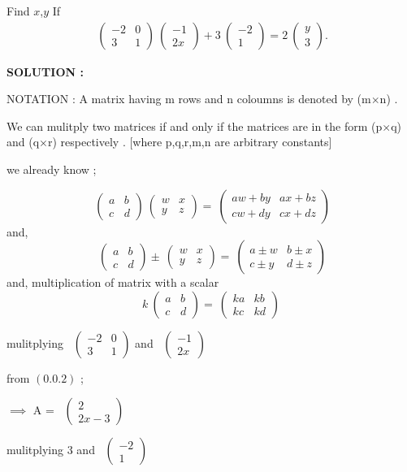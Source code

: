 \documentclass[journal,12pt,twocolumn]{IEEEtran}
\theoremstyle{remark}
\newcommand{\myvec}[1]{\ensuremath{\begin{pmatrix}#1\end{pmatrix}}}
\numberwithin{equation}{subsection}
\begin{document}
  Find $x$,$ y $       
       If 
       \begin{align}
       \ \myvec{-2 & 0\\3 & 1}
\ \myvec{-1\\2x}  
 + 3\ \myvec{-2 \\1 } 
 = 2\ \myvec{y \\3 } .
        \end{align}

  \bigskip
  \textbf{SOLUTION : }  
  
  {NOTATION : } A matrix having m rows and n coloumns is denoted by (m$\times$n) .
  
  We can mulitply two matrices if and only if the matrices are in the form (p$\times$q) and (q$\times$r) respectively .
   [where p,q,r,m,n are arbitrary constants]
   
  we already know ;
    
    \begin{equation}
       \ \myvec{a & b \\c & d } 
      \ \myvec{w & x \\y & z } 
      =
       \ \myvec{aw+ by & ax+ bz \\cw+ dy& cx+ dz} 
    \end{equation}
    and,
    \begin{equation}
      \ \myvec{a & b \\c & d } 
      \pm
      \ \myvec{w & x \\y & z } 
      =
       \ \myvec{a\pm w & b\pm x \\c\pm y& d\pm z} 
    \end{equation}
    and,
    multiplication of matrix with a scalar
    \begin{equation}
     k \ \myvec{a & b \\c & d } 
      =
       \ \myvec{ka & kb \\kc & kd } 
    \end{equation}
    
   mulitplying \ \myvec{-2 & 0 \\3 & 1 } 
      and 
      \ \myvec{-1 \\2x }
      
     from $(0.0.2)$ ;
      
      $\implies$  A = \ \myvec{2 \\2x-3 } 
      
    mulitplying 
    $3$ and
       \ \myvec{-2 \\1 } 
      
\end{document}
